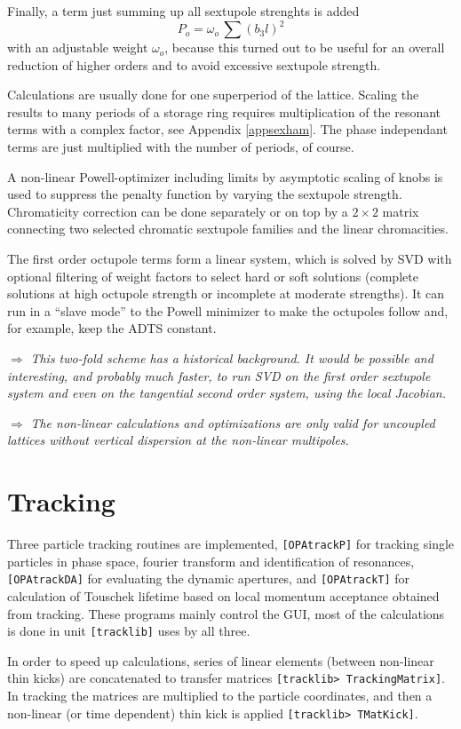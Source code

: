 \documentclass[12pt]{article}
\newcommand\todo[1]{$\Longrightarrow$ {\em #1} }
\newcommand\code[1]{{\tt [#1]}}
\begin{document}
Finally, a term just summing up all sextupole strenghts is added
\[
P_o= \omega_o \, \sum (b_3l)^2
\]
with an adjustable weight $\omega_o$, because this turned out to be useful for an overall reduction of higher orders and to avoid excessive sextupole strength.

Calculations are usually done for one superperiod of the lattice. Scaling the results to many periods of a storage ring requires multiplication of the resonant terms with a complex factor, see Appendix \ref{appsexham}. The phase independant terms are just multiplied with the number of periods, of course.

A non-linear Powell-optimizer \cite{numrec} including limits by asymptotic scaling of knobs is used to suppress the penalty function by varying the sextupole strength.
Chromaticity correction can be done separately or on top by a $2\times 2$ matrix connecting two selected chromatic sextupole families and the linear chromacities.

The first order octupole terms form a linear system, which is solved by SVD \cite{numrec} with optional filtering of weight factors to select hard or soft solutions (complete solutions at high octupole strength or incomplete at moderate strengths). It can run in a ``slave mode'' to the Powell minimizer to make the octupoles follow and, for example, keep the ADTS constant.

\todo{This two-fold scheme has a historical background. It would be possible and interesting, and probably much faster, to run SVD on the first order sextupole system and even on the tangential second order system, using the local Jacobian.}

\todo{The non-linear calculations and optimizations are only valid for uncoupled lattices without vertical dispersion at the non-linear multipoles.}


\section{Tracking}
Three particle tracking routines are implemented, \code{OPAtrackP} for tracking single particles in phase space, fourier transform and identification of resonances, \code{OPAtrackDA} for evaluating the dynamic apertures, and \code{OPAtrackT} for calculation of Touschek lifetime based on local momentum acceptance obtained from tracking. These programs mainly control the GUI, most of the calculations is done in unit \code{tracklib} uses by all three.

In order to speed up calculations, series of linear elements (between non-linear thin kicks) are concatenated to transfer matrices \code{tracklib> TrackingMatrix}. In tracking the matrices are multiplied to the particle coordinates, and then a non-linear (or time dependent) thin kick is applied \code{tracklib> TMatKick}.
\end{document}
